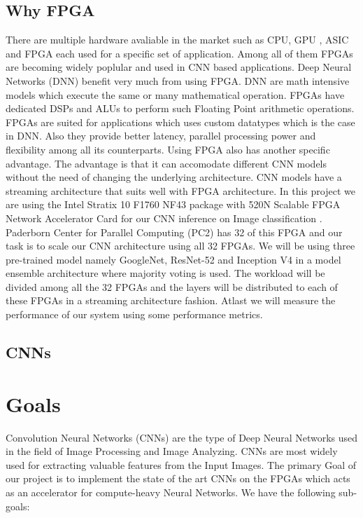 \documentclass[titlepage]{report}
\begin{document}
\section{Why FPGA}
There are multiple hardware avaliable in the market such as CPU, GPU , ASIC and FPGA each used for a specific set of application. Among all of them FPGAs are becoming widely poplular and used in CNN based applications. Deep Neural Networks (DNN) benefit very much from using FPGA. DNN are math intensive models which execute the same or many mathematical operation. FPGAs have dedicated DSPs and ALUs to perform such Floating Point arithmetic operations. FPGAs are suited for applications which uses custom datatypes which is the case in DNN. Also they provide better latency, parallel processing power and flexibility among all its counterparts. Using FPGA also has another specific advantage. The advantage is that it can accomodate different CNN models without the need of changing the underlying architecture. CNN models have a streaming architecture that suits well with FPGA architecture.
In this project we are using the Intel Stratix 10 F1760 NF43 package with 520N Scalable FPGA Network Accelerator Card for our CNN inference on Image classification . Paderborn Center for Parallel Computing (PC2) has 32 of this FPGA and our task is to scale our CNN architecture using all 32 FPGAs. We will be using three pre-trained model namely GoogleNet, ResNet-52 and Inception V4 in a model ensemble architecture where majority voting is used. The workload will be divided among all the 32 FPGAs and the layers will be distributed to each of these FPGAs in a streaming architecture fashion. Atlast we will measure the performance of our system using some performance metrics.

\lipsum[3]

\section{CNNs}

\lipsum[3]



\chapter{Goals}
Convolution Neural Networks (CNNs) are the type of Deep Neural Networks used in the field of Image Processing and Image Analyzing.
CNNs are most widely used for extracting valuable features from the Input Images.
The primary Goal of our project is to implement the state of the art CNNs on the FPGAs which acts as an accelerator for compute-heavy Neural Networks. \linebreak 
We have the following sub-goals:
\end{document}
